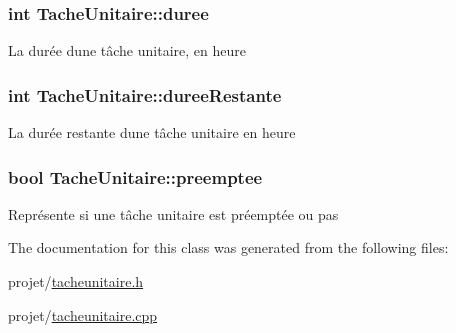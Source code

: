 \subsubsection[{duree}]{\setlength{\rightskip}{0pt plus 5cm}int Tache\+Unitaire\+::duree\hspace{0.3cm}{\ttfamily [private]}}\label{class_tache_unitaire_a5510c1941069a4391e076ec45e0201fc}
La durée d\textquotesingle{}une tâche unitaire, en heure \hypertarget{class_tache_unitaire_a73dd33a7047739e49c80373aeae3158e}{}
\subsubsection[{duree\+Restante}]{\setlength{\rightskip}{0pt plus 5cm}int Tache\+Unitaire\+::duree\+Restante\hspace{0.3cm}{\ttfamily [private]}}\label{class_tache_unitaire_a73dd33a7047739e49c80373aeae3158e}
La durée restante d\textquotesingle{}une tâche unitaire en heure \hypertarget{class_tache_unitaire_a21bc1074f99a80976a52d910e3c21041}{}
\subsubsection[{preemptee}]{\setlength{\rightskip}{0pt plus 5cm}bool Tache\+Unitaire\+::preemptee\hspace{0.3cm}{\ttfamily [private]}}\label{class_tache_unitaire_a21bc1074f99a80976a52d910e3c21041}
Représente si une tâche unitaire est préemptée ou pas 

The documentation for this class was generated from the following files\+:\begin{DoxyCompactItemize}
\item 
projet/\hyperlink{tacheunitaire_8h}{tacheunitaire.\+h}\item 
projet/\hyperlink{tacheunitaire_8cpp}{tacheunitaire.\+cpp}\end{DoxyCompactItemize}
